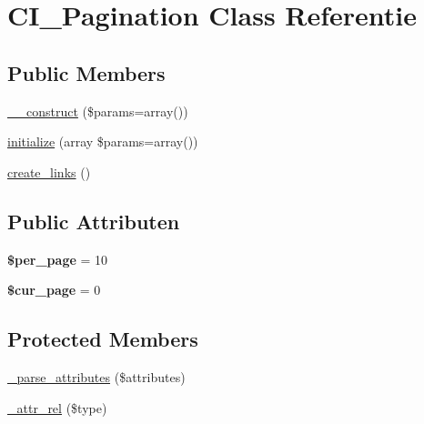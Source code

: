 \hypertarget{class_c_i___pagination}{}\section{C\+I\+\_\+\+Pagination Class Referentie}
\label{class_c_i___pagination}
\subsection*{Public Members}
\begin{DoxyCompactItemize}
\item 
\mbox{\hyperlink{class_c_i___pagination_a568ecdb0d73d2a870f33189739922a50}{\+\_\+\+\_\+construct}} (\$params=array())
\item 
\mbox{\hyperlink{class_c_i___pagination_a37ac2c18c8af8852be6947397aa92275}{initialize}} (array \$params=array())
\item 
\mbox{\hyperlink{class_c_i___pagination_afd580f4d296b1d416d2b4b03edef3bc5}{create\+\_\+links}} ()
\end{DoxyCompactItemize}
\subsection*{Public Attributen}
\begin{DoxyCompactItemize}
\item 
\mbox{\label{class_c_i___pagination_abece0f3099457a037f8f339811dc6e20}} 
{\bfseries \$per\+\_\+page} = 10
\item 
\mbox{\label{class_c_i___pagination_a0114271d3cbbe963a73efe317e3512c7}} 
{\bfseries \$cur\+\_\+page} = 0
\end{DoxyCompactItemize}
\subsection*{Protected Members}
\begin{DoxyCompactItemize}
\item 
\mbox{\hyperlink{class_c_i___pagination_ac8d823533e1a045a789a197373fedf0b}{\+\_\+parse\+\_\+attributes}} (\$attributes)
\item 
\mbox{\hyperlink{class_c_i___pagination_a0ebda639ff890a52b36ca5eaf27275c0}{\+\_\+attr\+\_\+rel}} (\$type)
\end{DoxyCompactItemize}
